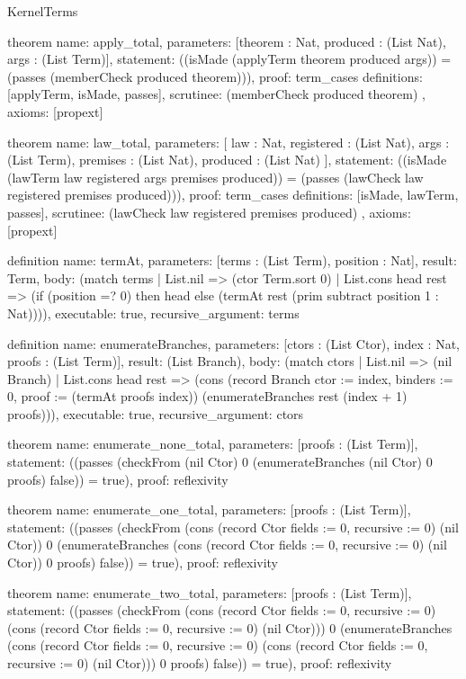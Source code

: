 \begin{lexlean}{KernelTerms}
\begin{semanticmodule}
theorem{
  name: apply_total,
  parameters: [theorem : Nat, produced : (List Nat), args : (List Term)],
  statement: ((isMade (applyTerm theorem produced args)) = (passes (memberCheck produced theorem))),
  proof: term_cases{
    definitions: [applyTerm, isMade, passes],
    scrutinee: (memberCheck produced theorem)
  },
  axioms: [propext]
}

theorem{
  name: law_total,
  parameters: [
    law : Nat,
    registered : (List Nat),
    args : (List Term),
    premises : (List Nat),
    produced : (List Nat)
  ],
  statement: ((isMade (lawTerm law registered args premises produced)) = (passes (lawCheck law registered premises produced))),
  proof: term_cases{
    definitions: [isMade, lawTerm, passes],
    scrutinee: (lawCheck law registered premises produced)
  },
  axioms: [propext]
}

definition{
  name: termAt,
  parameters: [terms : (List Term), position : Nat],
  result: Term,
  body: (match terms
    | List.nil => (ctor Term.sort 0)
    | List.cons head rest => (if (position =? 0) then head else (termAt rest (prim subtract position 1 : Nat)))),
  executable: true,
  recursive_argument: terms
}

definition{
  name: enumerateBranches,
  parameters: [ctors : (List Ctor), index : Nat, proofs : (List Term)],
  result: (List Branch),
  body: (match ctors
    | List.nil => (nil Branch)
    | List.cons head rest => (cons (record Branch {ctor := index, binders := 0, proof := (termAt proofs index)}) (enumerateBranches rest (index + 1) proofs))),
  executable: true,
  recursive_argument: ctors
}

theorem{
  name: enumerate_none_total,
  parameters: [proofs : (List Term)],
  statement: ((passes (checkFrom (nil Ctor) 0 (enumerateBranches (nil Ctor) 0 proofs) false)) = true),
  proof: reflexivity{}
}

theorem{
  name: enumerate_one_total,
  parameters: [proofs : (List Term)],
  statement: ((passes (checkFrom (cons (record Ctor {fields := 0, recursive := 0}) (nil Ctor)) 0 (enumerateBranches (cons (record Ctor {fields := 0, recursive := 0}) (nil Ctor)) 0 proofs) false)) = true),
  proof: reflexivity{}
}

theorem{
  name: enumerate_two_total,
  parameters: [proofs : (List Term)],
  statement: ((passes (checkFrom (cons (record Ctor {fields := 0, recursive := 0}) (cons (record Ctor {fields := 0, recursive := 0}) (nil Ctor))) 0 (enumerateBranches (cons (record Ctor {fields := 0, recursive := 0}) (cons (record Ctor {fields := 0, recursive := 0}) (nil Ctor))) 0 proofs) false)) = true),
  proof: reflexivity{}
}


\end{semanticmodule}
\end{lexlean}
